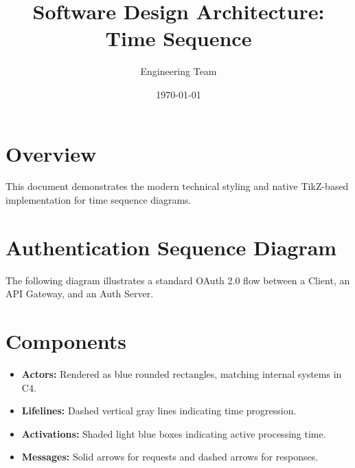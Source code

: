 \documentclass{modern-seq}
\title{Software Design Architecture: Time Sequence}
\author{Engineering Team}
\date{\today}
\begin{document}
\maketitle

\section{Overview}
This document demonstrates the modern technical styling and native TikZ-based implementation for time sequence diagrams.

\section{Authentication Sequence Diagram}
The following diagram illustrates a standard OAuth 2.0 flow between a Client, an API Gateway, and an Auth Server.

\begin{center}
\end{center}

\section{Components}
\begin{itemize}
    \item \textbf{Actors:} Rendered as blue rounded rectangles, matching internal systems in C4.
    \item \textbf{Lifelines:} Dashed vertical gray lines indicating time progression.
    \item \textbf{Activations:} Shaded light blue boxes indicating active processing time.
    \item \textbf{Messages:} Solid arrows for requests and dashed arrows for responses.
\end{itemize}
\end{document}
